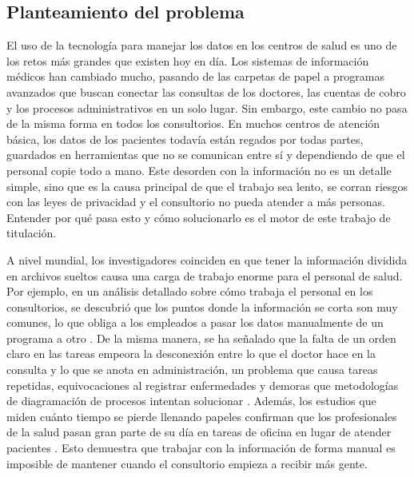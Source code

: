 \subsection{Planteamiento del problema}

El uso de la tecnología para manejar los datos en los centros de salud es uno de los retos más grandes que existen hoy en día. Los sistemas de información médicos han cambiado mucho, pasando de las carpetas de papel a programas avanzados que buscan conectar las consultas de los doctores, las cuentas de cobro y los procesos administrativos en un solo lugar. Sin embargo, este cambio no pasa de la misma forma en todos los consultorios. En muchos centros de atención básica, los datos de los pacientes todavía están regados por todas partes, guardados en herramientas que no se comunican entre sí y dependiendo de que el personal copie todo a mano. Este desorden con la información no es un detalle simple, sino que es la causa principal de que el trabajo sea lento, se corran riesgos con las leyes de privacidad y el consultorio no pueda atender a más personas. Entender por qué pasa esto y cómo solucionarlo es el motor de este trabajo de titulación.

A nivel mundial, los investigadores coinciden en que tener la información dividida en archivos sueltos causa una carga de trabajo enorme para el personal de salud. Por ejemplo, en un análisis detallado sobre cómo trabaja el personal en los consultorios, se descubrió que los puntos donde la información se corta son muy comunes, lo que obliga a los empleados a pasar los datos manualmente de un programa a otro \cite{antonacci2021process}. De la misma manera, se ha señalado que la falta de un orden claro en las tareas empeora la desconexión entre lo que el doctor hace en la consulta y lo que se anota en administración, un problema que causa tareas repetidas, equivocaciones al registrar enfermedades y demoras que metodologías de diagramación de procesos intentan solucionar \cite{PUFAHL2022102013}. Además, los estudios que miden cuánto tiempo se pierde llenando papeles confirman que los profesionales de la salud pasan gran parte de su día en tareas de oficina en lugar de atender pacientes \cite{Murad2024DocumentationBurden}. Esto demuestra que trabajar con la información de forma manual es imposible de mantener cuando el consultorio empieza a recibir más gente.

